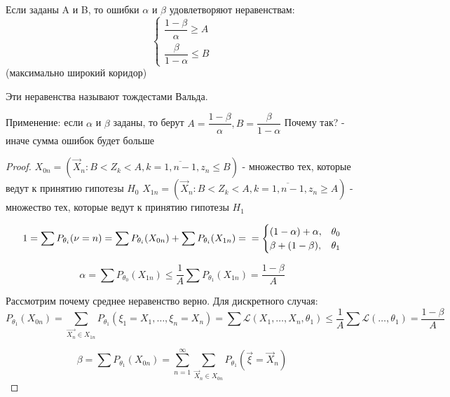 \begin{theorem}[Вальда]
  Если заданы A и B, то ошибки $\alpha$ и $\beta$ удовлетворяют неравенствам:
  \begin{equation*}
    \begin{cases}
      \dfrac{1 - \beta}{\alpha} \geqslant A \\[1em]
      \dfrac{\beta}{1 - \alpha} \leqslant B
    \end{cases}
  \end{equation*}
  (максимально широкий коридор)

  Эти неравенства называют тождестами Вальда.

\end{theorem}

Применение: если $\alpha$ и $\beta$ заданы, то берут $A = \dfrac{1-\beta}{\alpha}, B = \dfrac{\beta}{1 - \alpha}$
Почему так? - иначе сумма ошибок будет больше

\begin{proof}
  $X_{0n} = \left( \vec{X}_n : B < Z_k < A, k = \overline{1, n-1}, z_n \leqslant B \right)$ - множество тех, которые ведут к принятию гипотезы $H_0$
  $X_{1n} = \left( \vec{X}_n : B < Z_k < A, k = \overline{1, n-1}, z_n \geqslant A \right)$ - множество тех, которые ведут к принятию гипотезы $H_1$

  \begin{equation*}
    1 = \sum  P_{\theta_i} (\nu = n) = \sum P_{\theta_i} (X_{0n}) + \sum P_{\theta_i} (X_{1n}) = \\
    = \begin{cases}
      (1 - \alpha) + \alpha, &\theta_0 \\
      \beta + (1 - \beta), &\theta_1
    \end{cases} 
  \end{equation*}

  \[
    \alpha = \sum P_{\theta_0} (X_{1n}) \leqslant \dfrac{1}{A} \sum P_{\theta_1} (X_{1n}) = \dfrac{1 - \beta}{A}
  \]
  
  Рассмотрим почему среднее неравенство верно. Для дискретного случая:
  \[
    P_{\theta_1} (X_{0n}) = \sum_{\vec{X_n} \in X_{1n}} P_{\theta_1}(\xi_1 = X_1, \dots, \xi_n = X_n)= \sum \mathcal{L} (X_1, \dots, X_n, \theta_1) \leqslant \dfrac{1}{A} \sum \mathcal{L} (\dots, \theta_1) = \dfrac{1 - \beta}{A}
  \]

  \[
    \beta = \sum P_{\theta_1} (X_{0n}) = \sum_{n=1}^\infty \sum_{\vec{X}_n \in X_{0n}} P_{\theta_1} (\vec{\xi} = \vec{X}_n)
  \]
\end{proof}
